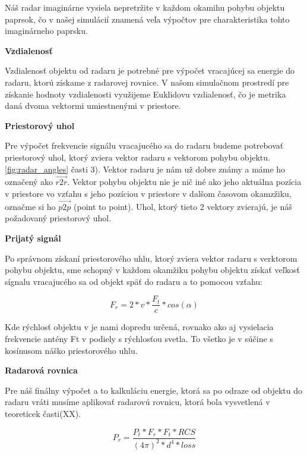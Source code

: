\documentclass[slovak]{ExcelAtFIT} %
\begin{document}
    Náš radar imaginárne vysiela nepretržite v každom okamihu pohybu objektu paprsok, čo v našej simulácií znamená veľa výpočtov pre charakteristika tohto imaginárneho paprsku.
    \newline

    \textbf{Vzdialenosť}

      Vzdialenosť objektu od radaru je potrebné pre výpočet vracajúcej sa energie do radaru, ktorú získame z radarovej rovnice.
      V našom simulačnom prostredí pre získanie hodnoty vzdialenosti využijeme Euklidovu vzdialenosť, čo je metrika daná dvoma vektormi umiestnenými v priestore.
      \newline

    \textbf{Priestorový uhol}

      Pre výpočet frekvencie signálu vracajucého sa do radaru budeme potrebovať priestorový uhol, ktorý zviera vektor radaru s vektorom pohybu objektu. \ref{fig:radar_angles} časti 3).
      Vektor radaru je nám už dobre známy a máme ho označený ako $\overrightarrow{r2r}$. Vektor pohybu objektu nie je nič iné ako jeho aktuálna pozícia v priestore vo vzťahu s jeho pozíciou v priestore v dalšom časovom okamzžiku, označme si ho $\overrightarrow{p2p}$ (point to point).
      Uhol, ktorý tieto 2 vektory zvierajú, je náš požadovaný priestorový uhol.
      \newline


    \textbf{Prijatý signál}

      Po správnom získaní priestorového uhlu, ktorý zviera vektor radaru s verktorom pohybu objektu, sme schopný v každom okamžiku pohybu objektu získať veľkosť sígnalu vracajucého sa od objekt späť do radaru a to pomocou vzťahu:

      \begin{equation} %
        F_{r} = 2 * v * \frac{F_{t}}{c} * cos(\alpha)
      \end{equation}   

      Kde rýchlosť objektu v je nami dopredu určená, rovnako ako aj vysielacia frekvencie antény Ft v podiely s rýchlosťou svetla. To všetko je v súčine s kosínusom náško priestorového uhlu.   

    \textbf{Radarová rovnica}

      Pre náš finálny výpočet a to kalkuláciu energie, ktorá sa po odraze od objektu do radaru vráti musíme aplikovať radarovú rovnicu, ktorá bola vysvetlená v teoreticek časti(XX).

      \begin{equation} %
        P_{r} = \frac{P_{t} * F_{r} * F_{t} * RCS}{(4\pi)^{2} * d^{4} * loss}
      \end{equation}   
\end{document}
